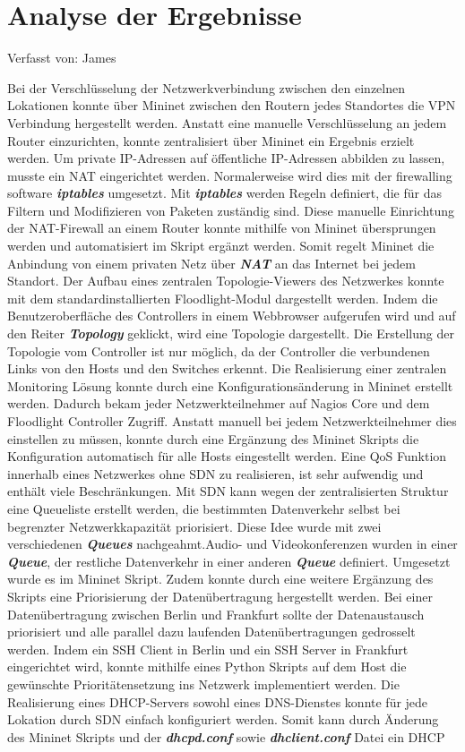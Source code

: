 \documentclass[fontsize=12pt,paper=a4,open=any,parskip=half,
  twoside=false,toc=listof,toc=bibliography,fleqn,leqno,
  captions=nooneline,captions=tableabove,british]{scrbook}
\begin{document}
{\section{Analyse der Ergebnisse}
{\tiny Verfasst von: James\par}
Bei der Verschlüsselung der Netzwerkverbindung zwischen den einzelnen Lokationen konnte über Mininet zwischen den Routern jedes Standortes die VPN Verbindung hergestellt werden. Anstatt eine manuelle Verschlüsselung an jedem Router einzurichten, konnte zentralisiert über Mininet ein Ergebnis erzielt werden. Um private IP-Adressen auf öffentliche IP-Adressen abbilden zu lassen, musste ein NAT eingerichtet werden. Normalerweise wird dies mit der firewalling software \textit{\textbf{iptables}} umgesetzt. Mit \textit{\textbf{iptables}} werden Regeln definiert, die für das Filtern und Modifizieren von Paketen zuständig sind. Diese manuelle Einrichtung der NAT-Firewall an einem Router konnte mithilfe von Mininet übersprungen werden und automatisiert im Skript ergänzt werden. Somit regelt Mininet die Anbindung von einem privaten Netz über \textit{\textbf{NAT}} an das Internet bei jedem Standort. Der Aufbau eines zentralen Topologie-Viewers des Netzwerkes konnte mit dem standardinstallierten Floodlight-Modul dargestellt werden. Indem die Benutzeroberfläche des Controllers in einem Webbrowser aufgerufen wird und auf den Reiter \textit{\textbf{Topology}} geklickt, wird eine Topologie dargestellt. Die Erstellung der Topologie vom Controller ist nur möglich, da der Controller die verbundenen Links von den Hosts und den Switches erkennt. Die Realisierung einer zentralen Monitoring Lösung konnte durch eine Konfigurationsänderung in Mininet erstellt werden. Dadurch bekam jeder Netzwerkteilnehmer auf Nagios Core und dem Floodlight Controller Zugriff. Anstatt manuell bei jedem Netzwerkteilnehmer dies einstellen zu müssen, konnte durch eine Ergänzung des Mininet Skripts die Konfiguration automatisch für alle Hosts eingestellt werden. Eine QoS Funktion innerhalb eines Netzwerkes ohne SDN zu realisieren, ist sehr aufwendig und enthält viele Beschränkungen. Mit SDN kann wegen der zentralisierten Struktur eine Queueliste erstellt werden, die bestimmten Datenverkehr selbst bei begrenzter Netzwerkkapazität priorisiert. Diese Idee wurde mit zwei verschiedenen \textit{\textbf{Queues}} nachgeahmt.Audio- und Videokonferenzen wurden in einer \textit{\textbf{Queue}}, der restliche Datenverkehr in einer anderen \textit{\textbf{Queue}} definiert. Umgesetzt wurde es im Mininet Skript. Zudem konnte durch eine weitere Ergänzung des Skripts eine Priorisierung der Datenübertragung hergestellt werden. Bei einer Datenübertragung zwischen Berlin und Frankfurt sollte der Datenaustausch priorisiert und alle parallel dazu laufenden Datenübertragungen gedrosselt werden. Indem ein SSH Client in Berlin und ein SSH Server in Frankfurt eingerichtet wird, konnte mithilfe eines Python Skripts auf dem Host die gewünschte Prioritätensetzung ins Netzwerk implementiert werden. Die Realisierung eines DHCP-Servers sowohl eines DNS-Dienstes konnte für jede Lokation durch SDN einfach konfiguriert werden. Somit kann durch Änderung des Mininet Skripts und der \textit{\textbf{dhcpd.conf}} sowie \textit{\textbf{dhclient.conf}} Datei ein DHCP }
\end{document}
